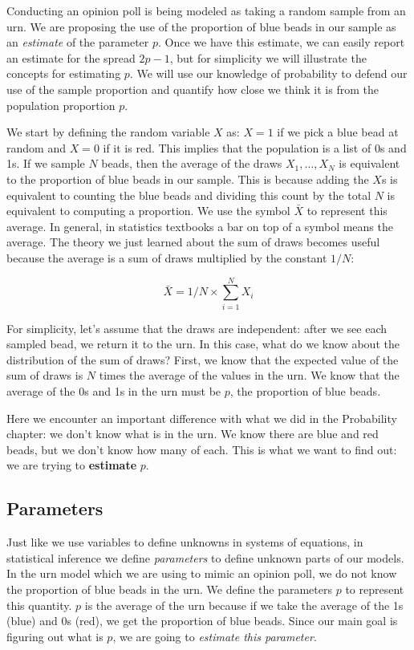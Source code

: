 \documentclass[openany]{book}
\begin{document}
Conducting an opinion poll is being modeled as taking a random sample from an urn. We are proposing the use of the proportion of blue beads in our sample as an \emph{estimate} of the parameter \(p\). Once we have this estimate, we can easily report an estimate for the spread \(2p-1\), but for simplicity we will illustrate the concepts for estimating \(p\). We will use our knowledge of probability to defend our use of the sample proportion and quantify how close we think it is from the population proportion \(p\).

We start by defining the random variable \(X\) as: \(X=1\) if we pick a blue bead at random and \(X=0\) if it is red. This implies that the population is a list of 0s and 1s. If we sample \(N\) beads, then the average of the draws \(X_1, \dots, X_N\) is equivalent to the proportion of blue beads in our sample. This is because adding the \(X\)s is equivalent to counting the blue beads and dividing this count by the total \(N\) is equivalent to computing a proportion. We use the symbol \(\bar{X}\) to represent this average. In general, in statistics textbooks a bar on top of a symbol means the average. The theory we just learned about the sum of draws becomes useful because the average is a sum of draws multiplied by the constant \(1/N\):

\[\bar{X} = 1/N \times \sum_{i=1}^N X_i\]

For simplicity, let's assume that the draws are independent: after we see each sampled bead, we return it to the urn. In this case, what do we know about the distribution of the sum of draws? First, we know that the expected value of the sum of draws is \(N\) times the average of the values in the urn. We know that the average of the 0s and 1s in the urn must be \(p\), the proportion of blue beads.

Here we encounter an important difference with what we did in the Probability chapter: we don't know what is in the urn. We know there are blue and red beads, but we don't know how many of each. This is what we want to find out: we are trying to \textbf{estimate} \(p\).

\hypertarget{parameters}{%
\subsection{Parameters}\label{parameters}}

Just like we use variables to define unknowns in systems of equations, in statistical inference we define \emph{parameters} to define unknown parts of our models. In the urn model which we are using to mimic an opinion poll, we do not know the proportion of blue beads in the urn. We define the parameters \(p\) to represent this quantity. \(p\) is the average of the urn because if we take the average of the 1s (blue) and 0s (red), we get the proportion of blue beads. Since our main goal is figuring out what is \(p\), we are going to \emph{estimate this parameter}.
\end{document}
